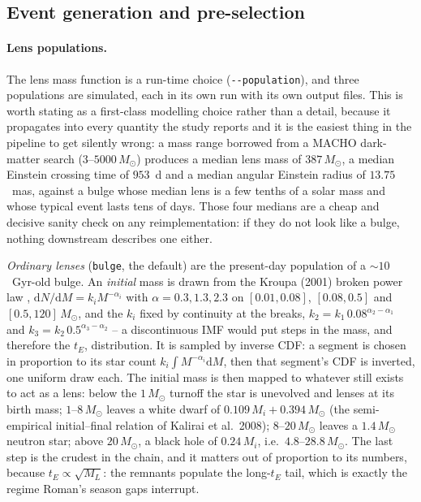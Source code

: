 \documentclass[english,10pt,a4paper]{article}
\begin{document}
	\subsection{Event generation and pre-selection}
	
	\paragraph{Lens populations.}\label{subsec:populations} The lens mass function is a run-time choice (\texttt{-{}-population}), and three populations are simulated, each in its own run with its own output files. This is worth stating as a first-class modelling choice rather than a detail, because it propagates into every quantity the study reports and it is the easiest thing in the pipeline to get silently wrong: a mass range borrowed from a MACHO dark-matter search ($3$--$5000\,M_\odot$) produces a median lens mass of $387\,M_\odot$, a median Einstein crossing time of $953$~d and a median angular Einstein radius of $13.75$~mas, against a bulge whose median lens is a few tenths of a solar mass and whose typical event lasts tens of days. Those four medians are a cheap and decisive sanity check on any reimplementation: if they do not look like a bulge, nothing downstream describes one either.

	\emph{Ordinary lenses} (\texttt{bulge}, the default) are the present-day population of a $\sim\!10$~Gyr-old bulge. An \emph{initial} mass is drawn from the Kroupa (2001) broken power law \cite{Kroupa2001}, $\mathrm{d}N/\mathrm{d}M = k_i M^{-\alpha_i}$ with $\alpha = 0.3, 1.3, 2.3$ on $[0.01, 0.08]$, $[0.08, 0.5]$ and $[0.5, 120]\,M_\odot$, and the $k_i$ fixed by continuity at the breaks, $k_2 = k_1\,0.08^{\alpha_2-\alpha_1}$ and $k_3 = k_2\,0.5^{\alpha_3-\alpha_2}$ -- a discontinuous IMF would put steps in the mass, and therefore the $t_E$, distribution. It is sampled by inverse CDF: a segment is chosen in proportion to its star count $k_i\int M^{-\alpha_i}\mathrm{d}M$, then that segment's CDF is inverted, one uniform draw each. The initial mass is then mapped to whatever still exists to act as a lens: below the $1\,M_\odot$ turnoff the star is unevolved and lenses at its birth mass; $1$--$8\,M_\odot$ leaves a white dwarf of $0.109\,M_i + 0.394\,M_\odot$ (the semi-empirical initial--final relation of Kalirai et al.\ 2008); $8$--$20\,M_\odot$ leaves a $1.4\,M_\odot$ neutron star; above $20\,M_\odot$, a black hole of $0.24\,M_i$, i.e.\ $4.8$--$28.8\,M_\odot$. The last step is the crudest in the chain, and it matters out of proportion to its numbers, because $t_E\propto\sqrt{M_L}$: the remnants populate the long-$t_E$ tail, which is exactly the regime Roman's season gaps interrupt.
\end{document}
